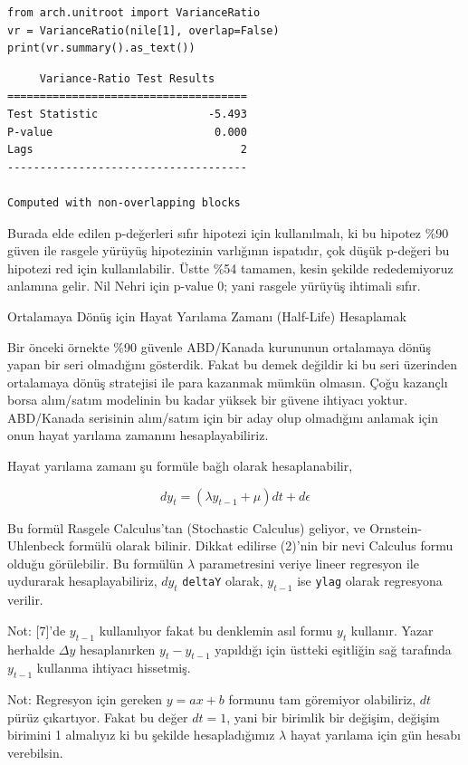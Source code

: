 \documentclass[12pt,fleqn]{article}\usepackage{../../common}
\begin{document}
\begin{verbatim}
from arch.unitroot import VarianceRatio
vr = VarianceRatio(nile[1], overlap=False)
print(vr.summary().as_text())
\end{verbatim}

\begin{verbatim}
     Variance-Ratio Test Results     
=====================================
Test Statistic                 -5.493
P-value                         0.000
Lags                                2
-------------------------------------

Computed with non-overlapping blocks
\end{verbatim}

Burada elde edilen p-değerleri sıfır hipotezi için kullanılmalı, ki bu
hipotez \%90 güven ile rasgele yürüyüş hipotezinin varlığının ispatıdır,
çok düşük p-değeri bu hipotezi red için kullanılabilir. Üstte \%54 tamamen,
kesin şekilde rededemiyoruz anlamına gelir. Nil Nehri için p-value 0; yani
rasgele yürüyüş ihtimali sıfır.

Ortalamaya Dönüş için Hayat Yarılama Zamanı (Half-Life) Hesaplamak

Bir önceki örnekte \%90 güvenle ABD/Kanada kurununun ortalamaya dönüş yapan
bir seri olmadığını gösterdik. Fakat bu demek değildir ki bu seri üzerinden
ortalamaya dönüş stratejisi ile para kazanmak mümkün olmasın. Çoğu kazançlı
borsa alım/satım modelinin bu kadar yüksek bir güvene ihtiyacı
yoktur. ABD/Kanada serisinin alım/satım için bir aday olup olmadığını
anlamak için onun hayat yarılama zamanını hesaplayabiliriz.

Hayat yarılama zamanı şu formüle bağlı olarak hesaplanabilir,

$$ dy_t = (\lambda y_{t-1} + \mu )dt + d\epsilon $$

Bu formül Rasgele Calculus'tan (Stochastic Calculus) geliyor, ve
Ornstein-Uhlenbeck formülü olarak bilinir. Dikkat edilirse (2)'nin bir nevi
Calculus formu olduğu görülebilir. Bu formülün $\lambda$ parametresini veriye
lineer regresyon ile uydurarak hesaplayabiliriz, $dy_t$ \verb!deltaY!  olarak,
$y_{t-1}$ ise \verb!ylag! olarak regresyona verilir.

Not: [7]'de $y_{t-1}$ kullanılıyor fakat bu denklemin asıl formu $y_t$
kullanır. Yazar herhalde $\Delta y$ hesaplanırken $y_t-y_{t-1}$ yapıldığı
için üstteki eşitliğin sağ tarafında $y_{t-1}$ kullanma ihtiyacı hissetmiş.

Not: Regresyon için gereken $y = ax + b$ formunu tam göremiyor olabiliriz,
$dt$ pürüz çıkartıyor. Fakat bu değer $dt=1$, yani bir birimlik bir
değişim, değişim birimini 1 almalıyız ki bu şekilde hesapladığımız
$\lambda$ hayat yarılama için gün hesabı verebilsin.
\end{document}
